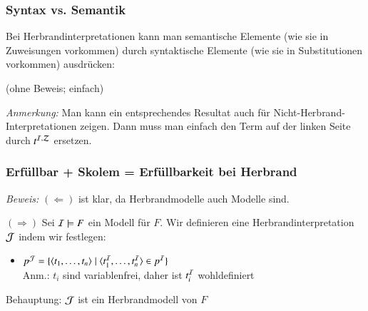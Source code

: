 \documentclass[aspectratio=1610,onlymath]{beamer}
\begin{document}
\bgroup
{}
\egroup

\begin{frame}\frametitle{Syntax vs. Semantik}

Bei Herbrandinterpretationen kann man semantische Elemente (wie sie in Zuweisungen vorkommen) durch syntaktische Elemente (wie sie in Substitutionen vorkommen) ausdrücken:\medskip


(ohne Beweis; einfach)
\bigskip

{\color{devilscss}\footnotesize \emph{Anmerkung:} Man kann ein entsprechendes Resultat auch für Nicht-Herbrand-Interpretationen zeigen. Dann muss man einfach den Term auf der linken Seite durch $t^{\mathcal{I},\mathcal{Z}}$ ersetzen.}

\end{frame}

\begin{frame}\frametitle{Erfüllbar + Skolem = Erfüllbarkeit bei Herbrand}

\pause

\emph{Beweis:} $(\Leftarrow)$ ist klar, da Herbrandmodelle auch Modelle sind.\bigskip\pause

$(\Rightarrow)$ Sei $\mathcal{I}\models F$ ein Modell für $F$. Wir definieren eine Herbrandinterpretation $\mathcal{J}$ indem wir festlegen:
\begin{itemize}
\item $p^{\mathcal{J}}=\{\langle{t_1,\ldots,t_n}\rangle\mid\langle{t_1^{\mathcal{I}},\ldots,t_n^{\mathcal{I}}}\rangle\in p^{\mathcal{I}}\}$\\
{\footnotesize Anm.: $t_i$ sind variablenfrei, daher ist $t_i^{\mathcal{I}}$ wohldefiniert}
\end{itemize}
Behauptung: \alert{$\mathcal{J}$ ist ein Herbrandmodell von $F$}

\end{frame}
\end{document}

